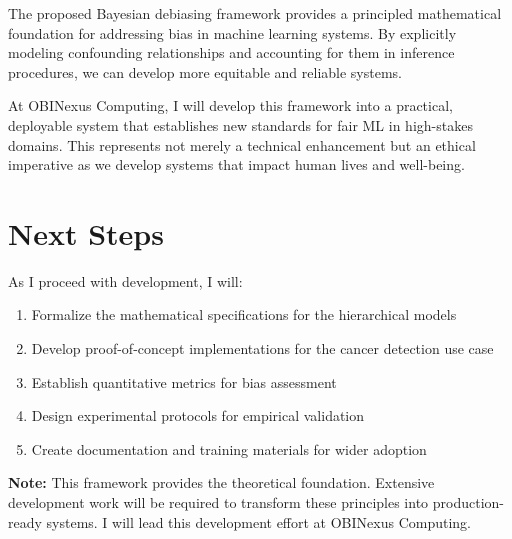\documentclass[12pt]{article}
\begin{document}
The proposed Bayesian debiasing framework provides a principled mathematical foundation for addressing bias in machine learning systems. By explicitly modeling confounding relationships and accounting for them in inference procedures, we can develop more equitable and reliable systems.

At OBINexus Computing, I will develop this framework into a practical, deployable system that establishes new standards for fair ML in high-stakes domains. This represents not merely a technical enhancement but an ethical imperative as we develop systems that impact human lives and well-being.

\section{Next Steps}

As I proceed with development, I will:

\begin{enumerate}
    \item Formalize the mathematical specifications for the hierarchical models
    \item Develop proof-of-concept implementations for the cancer detection use case
    \item Establish quantitative metrics for bias assessment
    \item Design experimental protocols for empirical validation
    \item Create documentation and training materials for wider adoption
\end{enumerate}

\textbf{Note:} This framework provides the theoretical foundation. Extensive development work will be required to transform these principles into production-ready systems. I will lead this development effort at OBINexus Computing.
\end{document}
